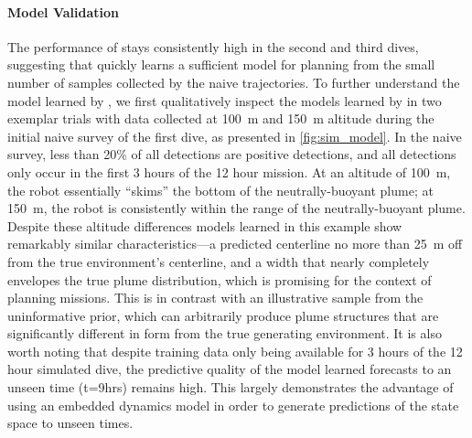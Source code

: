 \paragraph{\PHUMES Model Validation}
The performance of \PHORTEX stays consistently high in the second and third dives, suggesting that \PHUMES quickly learns a sufficient model for planning from the small number of samples collected by the naive trajectories. To further understand the model learned by \PHUMES, we first qualitatively inspect the models learned by \PHUMES in two exemplar trials with data collected at \SI{100}{\meter} and \SI{150}{\meter} altitude during the initial naive survey of the first dive, as presented in \cref{fig:sim_model}. In the naive survey, less than 20\% of all detections are positive detections, and all detections only occur in the first 3 hours of the 12 hour mission. At an altitude of \SI{100}{\meter}, the robot essentially ``skims'' the bottom of the neutrally-buoyant plume; at \SI{150}{\meter}, the robot is consistently within the range of the neutrally-buoyant plume. Despite these altitude differences models learned in this example show remarkably similar characteristics---a predicted centerline no more than \SI{25}{\meter} off from the true environment's centerline, and a width that nearly completely envelopes the true plume distribution, which is promising for the context of planning missions. This is in contrast with an illustrative sample from the uninformative prior, which can arbitrarily produce plume structures that are significantly different in form from the true generating environment. It is also worth noting that despite training data only being available for 3 hours of the 12 hour simulated dive, the predictive quality of the model learned forecasts to an unseen time (t=9hrs) remains high. This largely demonstrates the advantage of using an embedded dynamics model in order to generate predictions of the state space to unseen times.

